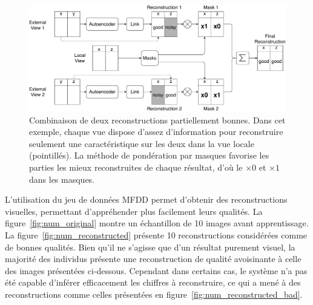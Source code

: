 \documentclass[a4paper]{article}
\begin{document}
\begin{figure}[H]
    \centering
    \includegraphics[scale=.38]{img/process_mwm}
    \caption{Combinaison de deux reconstructions partiellement bonnes. Dans cet exemple, chaque vue dispose d'assez d'information pour reconstruire seulement une caractéristique sur les deux dans la vue locale (pointillés). La méthode de pondération par masques favorise les parties les mieux reconstruites de chaque résultat, d'où le $\times 0$ et $\times 1$ dans les masques.}
\label{fig:sum_process_mwm}
\end{figure}

L'utilisation du jeu de données MFDD permet d'obtenir des reconstructions visuelles, permettant d'appréhender plus facilement leurs qualités. La figure~\ref{fig:num_original} montre un échantillon de 10 images avant apprentissage. La figure~\ref{fig:num_reconstructed} présente 10 reconstructions considérées comme de bonnes qualités. Bien qu'il ne s'agisse que d'un résultat purement visuel, la majorité des individus présente une reconstruction de qualité avoisinante à celle des images présentées ci-dessous. Cependant dans certains cas, le système n'a pas été capable d'inférer efficacement les chiffres à reconstruire, ce qui a mené à des reconstructions comme celles présentées en figure~\ref{fig:num_reconstructed_bad}.
\end{document}
